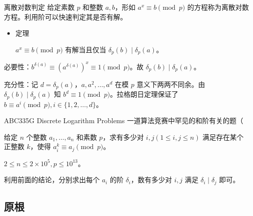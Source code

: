 \documentclass [hyperref={bookmarksdepth=4}, aspectratio=169] {beamer}
\theoremstyle {fy}
\begin{document}
\begin{frame}{离散对数判定}
给定素数 $p$ 和整数 $a,b$，形如 $a^x\equiv b\pmod p$ 的方程称为离散对数方程。利用阶可以快速判定其是否有解。

\begin{itemize}
    \item 定理

  $a^x\equiv b\pmod p$ 有解当且仅当 $\delta_p(b)\mid \delta_p(a)$。
\end{itemize}

必要性：$b^{\delta(a)}\equiv (a^{\delta(a)})^x\equiv 1\pmod p$。故 $\delta_p(b)\mid\delta_p(a)$。

充分性：记 $d=\delta_p(a)$，$a,a^2,\dots,a^d$ 在模 $p$ 意义下两两不同余。由 $\delta_p(b)\mid\delta_p(a)$ 知 $b^d\equiv 1\pmod p$。拉格朗日定理保证了 $b\equiv a^i\pmod p,i\in\{1,2,\dots,d\}$。
\end{frame}

\begin{frame}{ABC335G Discrete Logarithm Problems}
一道算法竞赛中罕见的和阶有关的题（

给定 $n$ 个整数 $a_1,\dots,a_n$ 和素数 $p$，求有多少对 $i,j(1\le i,j\le n)$ 满足存在某个正整数 $k$，使得 $a_i^k\equiv a_j\pmod p$。

$2\le n\le 2\times10^5,p\le 10^{13}$。

利用前面的结论，分别求出每个 $a_i$ 的阶 $\delta_i$，数有多少对 $i,j$ 满足 $\delta_i\mid\delta_j$ 即可。
\end{frame}

\subsection{原根}
\end{document}
